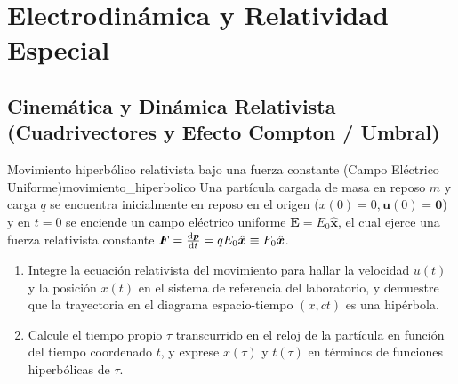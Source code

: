 \documentclass[11pt,a4paper]{book}
\newcommand{\xhat}{\hat{\bm{x}}}
\newcommand{\Evec}{\bm{E}}
\begin{document}
\chapter{Electrodinámica y Relatividad Especial}

\section[Cinemática y dinámica relativista]{Cinemática y Dinámica Relativista (Cuadrivectores y Efecto Compton / Umbral)}

\begin{ejercicio}{Movimiento hiperbólico relativista bajo una fuerza constante (Campo Eléctrico Uniforme)}{movimiento_hiperbolico}
Una partícula cargada de masa en reposo $m$ y carga $q$ se encuentra inicialmente en reposo en el origen ($x(0) = 0, \bm{u}(0) = \bm{0}$) y en $t = 0$ se enciende un campo eléctrico uniforme $\Evec = E_0 \xhat$, el cual ejerce una fuerza relativista constante $\bm{F} = \dv{\bm{p}}{t} = qE_0\xhat \equiv F_0\xhat$.
\begin{enumerate}[label=\alph*)]
    \item Integre la ecuación relativista del movimiento para hallar la velocidad $u(t)$ y la posición $x(t)$ en el sistema de referencia del laboratorio, y demuestre que la trayectoria en el diagrama espacio-tiempo $(x, ct)$ es una hipérbola.
    \item Calcule el tiempo propio $\tau$ transcurrido en el reloj de la partícula en función del tiempo coordenado $t$, y exprese $x(\tau)$ y $t(\tau)$ en términos de funciones hiperbólicas de $\tau$.
\end{enumerate}
\end{ejercicio}
\end{document}

